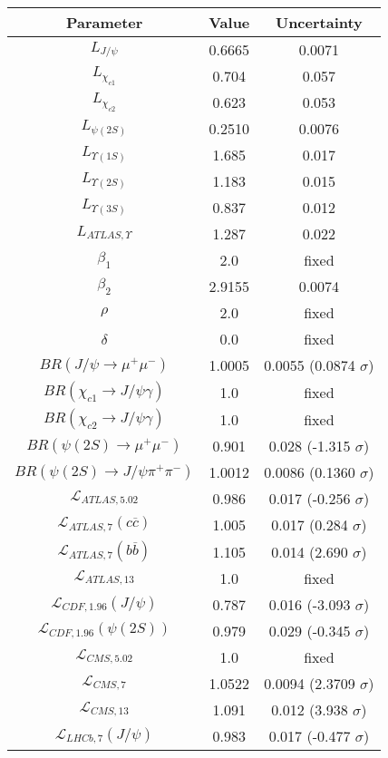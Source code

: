 \begin{table}[h!]
\centering
\begin{tabular}{c|c|c}
Parameter & Value & Uncertainty \\
\hline
$L_{J/\psi}$ & 0.6665 & 0.0071 \\
$L_{\chi_{c1}}$ & 0.704 & 0.057 \\
$L_{\chi_{c2}}$ & 0.623 & 0.053 \\
$L_{\psi(2S)}$ & 0.2510 & 0.0076 \\
$L_{\Upsilon(1S)}$ & 1.685 & 0.017 \\
$L_{\Upsilon(2S)}$ & 1.183 & 0.015 \\
$L_{\Upsilon(3S)}$ & 0.837 & 0.012 \\
$L_{ATLAS,\Upsilon}$ & 1.287 & 0.022 \\
$\beta_1$ & 2.0 & fixed \\
$\beta_2$ & 2.9155 & 0.0074 \\
$\rho$ & 2.0 & fixed \\
$\delta$ & 0.0 & fixed \\
$BR(J/\psi\rightarrow\mu^+\mu^-)$ & 1.0005 & 0.0055 (0.0874 $\sigma$) \\
$BR(\chi_{c1}\rightarrow J/\psi\gamma)$ & 1.0 & fixed \\
$BR(\chi_{c2}\rightarrow J/\psi\gamma)$ & 1.0 & fixed \\
$BR(\psi(2S)\rightarrow\mu^+\mu^-)$ & 0.901 & 0.028 (-1.315 $\sigma$) \\
$BR(\psi(2S)\rightarrow J/\psi\pi^+\pi^-)$ & 1.0012 & 0.0086 (0.1360 $\sigma$) \\
$\mathcal L_{ATLAS,5.02}$ & 0.986 & 0.017 (-0.256 $\sigma$) \\
$\mathcal L_{ATLAS,7}(c\overline c)$ & 1.005 & 0.017 (0.284 $\sigma$) \\
$\mathcal L_{ATLAS,7}(b\overline b)$ & 1.105 & 0.014 (2.690 $\sigma$) \\
$\mathcal L_{ATLAS,13}$ & 1.0 & fixed \\
$\mathcal L_{CDF,1.96}(J/\psi)$ & 0.787 & 0.016 (-3.093 $\sigma$) \\
$\mathcal L_{CDF,1.96}(\psi(2S))$ & 0.979 & 0.029 (-0.345 $\sigma$) \\
$\mathcal L_{CMS,5.02}$ & 1.0 & fixed \\
$\mathcal L_{CMS,7}$ & 1.0522 & 0.0094 (2.3709 $\sigma$) \\
$\mathcal L_{CMS,13}$ & 1.091 & 0.012 (3.938 $\sigma$) \\
$\mathcal L_{LHCb,7}(J/\psi)$ & 0.983 & 0.017 (-0.477 $\sigma$) \\

\end{tabular}
\end{table}
